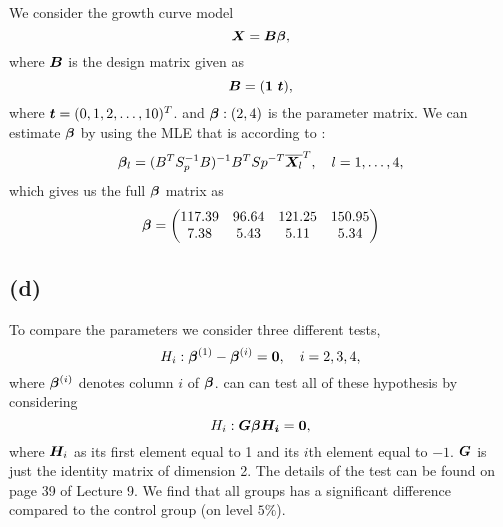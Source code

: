 We consider the growth curve model 
\begin{equation*}
  \bm{X} = \bm{B\beta},
\end{equation*}
where $\bm{B}$ is the design matrix given as
\begin{equation*}
  \bm{B} = (\bm{1}\ \bm{t}), 
\end{equation*}
where $\bm{t} = (0, 1, 2, \dots, 10)^T$. and $\bm{\beta} :(2,4)$ is the
parameter matrix. We can estimate $\bm{\beta}$ by using the MLE that is
according to \cite[p.330]{book}:
\begin{equation*}
  \bm{\beta}_l = (B^TS_p^{-1}B)^{-1}B^TSp^{-T}\overline{\bm{X}_{l}}^T,\quad
l = 1,\dots, 4,
\end{equation*}
which gives us the full $\bm{\beta}$ matrix as
\begin{equation*}
  \bm{\beta} =
  \begin{pmatrix}
    117.39 &96.64 &121.25 &150.95 \\ 
    7.38 &5.43 &5.11 &5.34
  \end{pmatrix}
\end{equation*}

\subsection*{(d)}
\label{sec:d-2}

To compare the parameters we consider three different tests,
\begin{equation*}
  H_i: \bm{\beta}^{(1)} - \bm{\beta}^{(i)} = \bm{0},\quad i = 2,3,4,
\end{equation*}
where $\bm{\beta}^{(i)}$ denotes column $i$ of $\bm{\beta}$.
can can test all of these hypothesis by considering
\begin{equation*}
  H_i: \bm{G \beta H_i} = \bm{0}, 
\end{equation*}
where $\bm{H}_i$ as its first element equal to 1 and its $i$th element
equal to $-1$. $\bm{G}$ is just the identity matrix of dimension 2. The
details of the test can be found on page 39 of Lecture 9. We find that
all groups has a significant difference  compared to the control group (on
level $5\%$).

